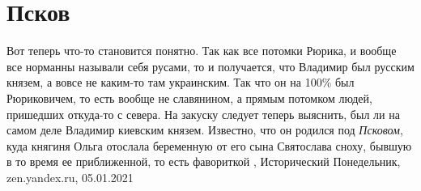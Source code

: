  
 
 
 
 
\chapter{Псков}

Вот теперь что-то становится понятно. Так как все потомки Рюрика, и вообще все
норманны называли себя русами, то и получается, что Владимир был русским
князем, а вовсе не каким-то там украинским. Так что он на 100\% был
Рюриковичем, то есть вообще не славянином, а прямым потомком людей, пришедших
откуда-то с севера.  На закуску следует теперь выяснить, был ли на самом деле
Владимир киевским князем. Известно, что он родился под \emph{Псковом}, куда княгиня
Ольга отослала беременную от его сына Святослава сноху, бывшую в то время ее
приближенной, то есть фавориткой
,
Исторический Понедельник, zen.yandex.ru, 05.01.2021 

